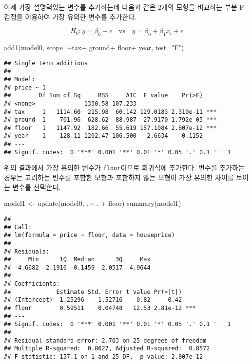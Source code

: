 \documentclass[
]{book}
\newenvironment{Shaded}{\begin{snugshade}}{\end{snugshade}}
\newcommand{\AttributeTok}[1]{\textcolor[rgb]{0.77,0.63,0.00}{#1}}
\newcommand{\FunctionTok}[1]{\textcolor[rgb]{0.00,0.00,0.00}{#1}}
\newcommand{\NormalTok}[1]{#1}
\newcommand{\OtherTok}[1]{\textcolor[rgb]{0.56,0.35,0.01}{#1}}
\newcommand{\SpecialCharTok}[1]{\textcolor[rgb]{0.00,0.00,0.00}{#1}}
\newcommand{\StringTok}[1]{\textcolor[rgb]{0.31,0.60,0.02}{#1}}
\begin{document}
이제 가장 설명력있는 변수를 추가하는데 다음과 같은 2개의 모형을 비교하는 부분 F 검정을 이용하여 가장 유의한 변수를 추가한다.

\[ H_0: y=\beta_0 + \epsilon \quad \text{vs} \quad y=\beta_0 + \beta_1 x_i + \epsilon \]

\begin{Shaded}
\begin{Highlighting}[]
\FunctionTok{add1}\NormalTok{(model0, }\AttributeTok{scope=}\SpecialCharTok{\textasciitilde{}}\NormalTok{tax}\SpecialCharTok{+}\NormalTok{ ground}\SpecialCharTok{+}\NormalTok{ floor}\SpecialCharTok{+}\NormalTok{ year, }\AttributeTok{test=}\StringTok{"F"}\NormalTok{)}
\end{Highlighting}
\end{Shaded}

\begin{verbatim}
## Single term additions
## 
## Model:
## price ~ 1
##        Df Sum of Sq     RSS     AIC  F value    Pr(>F)    
## <none>              1330.58 107.233                       
## tax     1   1114.60  215.98  60.142 129.0183 2.310e-11 ***
## ground  1    701.96  628.62  88.987  27.9170 1.792e-05 ***
## floor   1   1147.92  182.66  55.619 157.1084 2.807e-12 ***
## year    1    128.11 1202.47 106.500   2.6634    0.1152    
## ---
## Signif. codes:  0 '***' 0.001 '**' 0.01 '*' 0.05 '.' 0.1 ' ' 1
\end{verbatim}

위의 결과에서 가장 유의한 변수가 \texttt{floor}이므로 회귀식에 추가한다. 변수를 추가하는 경우는 고려하는 변수를 포함한 모형과 포함하지 않는 모형이 가장 유의한 차이를 보이는 변수를 선택한다.

\begin{Shaded}
\begin{Highlighting}[]
\NormalTok{model1 }\OtherTok{\textless{}{-}} \FunctionTok{update}\NormalTok{(model0, . }\SpecialCharTok{\textasciitilde{}}\NormalTok{ . }\SpecialCharTok{+}\NormalTok{ floor)}
\FunctionTok{summary}\NormalTok{(model1)}
\end{Highlighting}
\end{Shaded}

\begin{verbatim}
## 
## Call:
## lm(formula = price ~ floor, data = houseprice)
## 
## Residuals:
##     Min      1Q  Median      3Q     Max 
## -4.6682 -2.1916 -0.1459  2.0517  4.9644 
## 
## Coefficients:
##             Estimate Std. Error t value Pr(>|t|)    
## (Intercept)  1.25296    1.52716    0.82     0.42    
## floor        0.59511    0.04748   12.53 2.81e-12 ***
## ---
## Signif. codes:  0 '***' 0.001 '**' 0.01 '*' 0.05 '.' 0.1 ' ' 1
## 
## Residual standard error: 2.703 on 25 degrees of freedom
## Multiple R-squared:  0.8627, Adjusted R-squared:  0.8572 
## F-statistic: 157.1 on 1 and 25 DF,  p-value: 2.807e-12
\end{verbatim}
\end{document}

